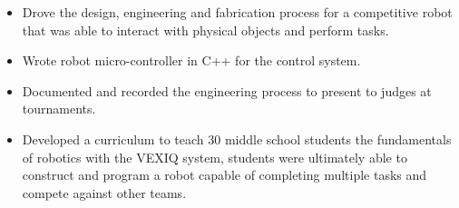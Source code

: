 \documentclass[10pt,a4paper,ragged2e,withhyper]{altacv}
\begin{document}
\begin{paracol}{2}
    \begin{itemize}
        \item Drove the design, engineering and fabrication process for a competitive robot that was able to interact with physical objects and perform tasks.
        \item Wrote robot micro-controller in C++ for the control system.
        \item Documented and recorded the engineering process to present to judges at tournaments.
        \item Developed a curriculum to teach 30 middle school students the fundamentals of robotics with the VEXIQ system, students were ultimately able to construct and program a robot capable of completing multiple tasks and compete against other teams.
    \end{itemize}





\end{paracol}
\end{document}
